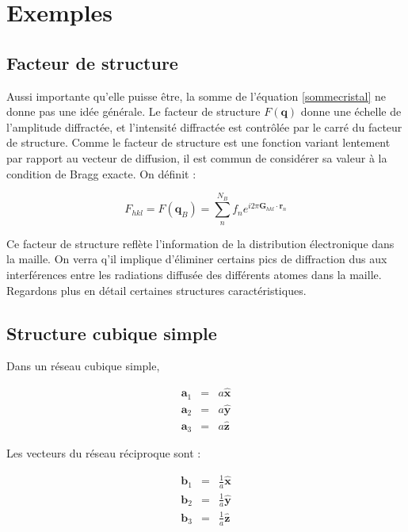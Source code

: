 \section{Exemples}

\subsection{Facteur de structure}

Aussi importante qu'elle puisse être, la somme de l'équation \ref{sommecristal}
ne donne pas une idée générale. Le facteur de structure $F(\mathbf{q})$ donne une
échelle de l'amplitude diffractée, et l'intensité diffractée est contrôlée
par le carré du facteur de structure. Comme le facteur de structure est une
fonction variant lentement par rapport au vecteur de diffusion, il est commun de
considérer sa valeur à la condition de Bragg exacte. On définit :

\begin{equation}
    F_{hkl} = F(\mathbf{q}_B) = \sum_n^{N_B} f_n e^{i2\pi \mathbf{G}_{hkl}\cdot\mathbf{r}_n}
\end{equation}

Ce facteur de structure reflète l'information de la distribution électronique
dans la maille. On verra q'il implique d'éliminer certains pics de diffraction
dus aux interférences entre les radiations diffusée des différents atomes dans
la maille.
Regardons plus en détail certaines structures caractéristiques.

\subsection{Structure cubique simple}

Dans un réseau cubique simple,

\begin{eqnarray}
    \mathbf{a}_1 & = & a \mathbf{\hat x} \\
    \mathbf{a}_2 & = & a \mathbf{\hat y} \\
    \mathbf{a}_3 & = & a \mathbf{\hat z}
\end{eqnarray}

Les vecteurs du réseau réciproque sont :

\begin{eqnarray}
    \mathbf{b}_1 & = & \frac{1}{a} \mathbf{\hat x} \\
    \mathbf{b}_2 & = & \frac{1}{a} \mathbf{\hat y} \\
    \mathbf{b}_3 & = & \frac{1}{a} \mathbf{\hat z}
\end{eqnarray}

